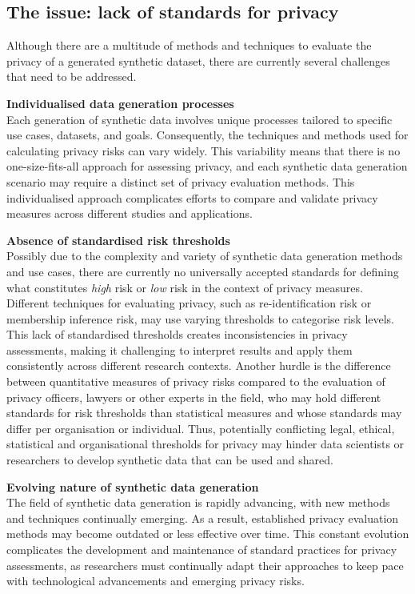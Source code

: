  \subsection{The issue: lack of standards for privacy}
 Although there are a multitude of methods and techniques to evaluate the privacy of a generated synthetic dataset, there are currently several challenges that need to be addressed. 
 
 \textbf{Individualised data generation processes} \\
 Each generation of synthetic data involves unique processes tailored to specific use cases, datasets, and goals. Consequently, the techniques and methods used for calculating privacy risks can vary widely. This variability means that there is no one-size-fits-all approach for assessing privacy, and each synthetic data generation scenario may require a distinct set of privacy evaluation methods. This individualised approach complicates efforts to compare and validate privacy measures across different studies and applications.
 
 \textbf{Absence of standardised risk thresholds} \\
Possibly due to the complexity and variety of synthetic data generation methods and use cases, there are currently no universally accepted standards for defining what constitutes \textit{high} risk or \textit{low} risk in the context of privacy measures. Different techniques for evaluating privacy, such as re-identification risk or membership inference risk, may use varying thresholds to categorise risk levels. This lack of standardised thresholds creates inconsistencies in privacy assessments, making it challenging to interpret results and apply them consistently across different research contexts. Another hurdle is the difference between quantitative measures of privacy risks compared to the evaluation of privacy officers, lawyers or other experts in the field, who may hold different standards for risk thresholds than statistical measures and whose standards may differ per organisation or individual. Thus, potentially conflicting legal, ethical, statistical and organisational thresholds for privacy may hinder data scientists or researchers to develop synthetic data that can be used and shared. 
 
 \textbf{Evolving nature of synthetic data generation} \\
 The field of synthetic data generation is rapidly advancing, with new methods and techniques continually emerging. As a result, established privacy evaluation methods may become outdated or less effective over time. This constant evolution complicates the development and maintenance of standard practices for privacy assessments, as researchers must continually adapt their approaches to keep pace with technological advancements and emerging privacy risks.

